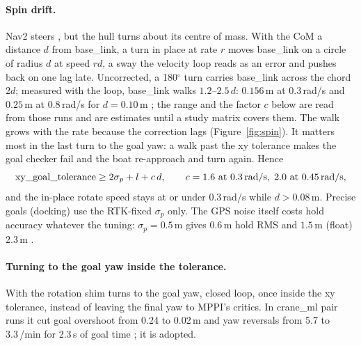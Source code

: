 \paragraph{Spin drift.} Nav2 steers , but the hull turns about its centre of
mass. With the CoM a distance $d$ from base\_link, a turn in place at rate $r$ moves base\_link
on a circle of radius $d$ at speed $r d$, a sway the velocity loop reads as an error and pushes
back on one lag late. Uncorrected, a 180$^\circ$ turn carries base\_link across the chord $2d$;
measured with the loop, base\_link walks $1.2$--$2.5\,d$: $0.156$\,m at 0.3\,rad/s and $0.25$\,m at
0.8\,rad/s for $d = 0.10$\,m ; the range
and the factor $c$ below are read from those runs and are estimates until a study matrix
covers them. The walk grows with the rate because the
correction lags (Figure~\ref{fig:spin}). It matters most in the last turn to the goal yaw: a walk
past the xy tolerance makes the goal checker fail and the boat re-approach and turn again.
Hence
\[
  \text{xy\_goal\_tolerance} \ge 2\sigma_p + l + c\,d,\qquad c = 1.6 \text{ at } 0.3\text{\,rad/s},\; 2.0 \text{ at } 0.45\text{\,rad/s},
\]
and the in-place rotate speed stays at or under 0.3\,rad/s while $d > 0.08$\,m. Precise goals
(docking) use the RTK-fixed $\sigma_p$ only. The GPS noise itself costs hold accuracy whatever the
tuning: $\sigma_p = 0.5$\,m gives 0.6\,m hold RMS and $1.5$\,m (float) 2.3\,m
.

\paragraph{Turning to the goal yaw inside the tolerance.} With 
the rotation shim turns to the goal yaw, closed loop, once inside the xy tolerance, instead of
leaving the final yaw to MPPI's critics. In crane\_ml pair runs it cut goal overshoot from 0.24 to
0.02\,m and yaw reversals from 5.7 to 3.3\,/min for 2.3\,s of goal time
; it is adopted.


